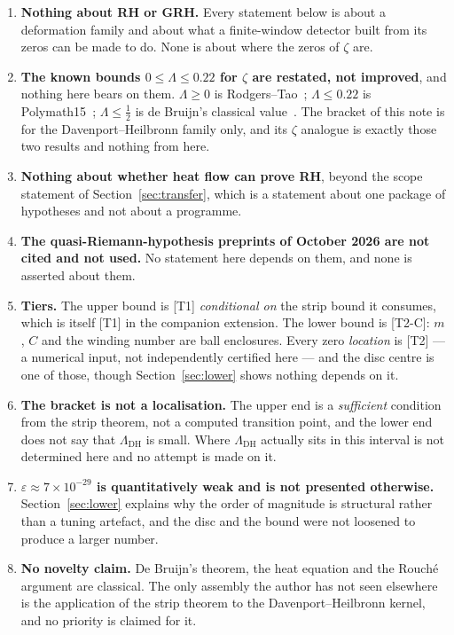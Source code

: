 \documentclass[11pt,a4paper]{article}
\theoremstyle{remark}
\newcommand{\tier}[1]{{\small\textsf{[#1]}}}
\newcommand{\LamDH}{\Lambda_{\mathrm{DH}}}
\begin{document}
\begin{enumerate}\itemsep3pt
\item \textbf{Nothing about RH or GRH.} Every statement below is about a deformation family
and about what a finite-window detector built from its zeros can be made to do. None is
about where the zeros of $\zeta$ are.

\item \textbf{The known bounds $0\le\Lambda\le0.22$ for $\zeta$ are restated, not
improved}, and nothing here bears on them. $\Lambda\ge0$ is Rodgers--Tao~\cite{RT};
$\Lambda\le0.22$ is Polymath15~\cite{P15}; $\Lambda\le\tfrac12$ is de Bruijn's classical
value~\cite{DB50}. The bracket of this note is for the Davenport--Heilbronn family only, and
its $\zeta$ analogue is exactly those two results and nothing from here.

\item \textbf{Nothing about whether heat flow can prove RH}, beyond the scope statement of
Section~\ref{sec:transfer}, which is a statement about one package of hypotheses and not
about a programme.

\item \textbf{The quasi-Riemann-hypothesis preprints of October 2026 are not cited and not
used.} No statement here depends on them, and none is asserted about them.

\item \textbf{Tiers.} The upper bound is \tier{T1} \emph{conditional on} the strip bound it
consumes, which is itself \tier{T1} in the companion extension. The lower bound is
\tier{T2-C}: $m$, $C$ and the winding number are ball enclosures. Every zero
\emph{location} is \tier{T2} --- a numerical input, not independently certified here --- and
the disc centre is one of those, though Section~\ref{sec:lower} shows nothing depends on it.

\item \textbf{The bracket is not a localisation.} The upper end is a \emph{sufficient}
condition from the strip theorem, not a computed transition point, and the lower end does
not say that $\LamDH$ is small. Where $\LamDH$ actually sits in this interval is not
determined here and no attempt is made on it.

\item \textbf{$\varepsilon\approx 7\times10^{-29}$ is quantitatively weak and is not
presented otherwise.} Section~\ref{sec:lower} explains why the order of magnitude is
structural rather than a tuning artefact, and the disc and the bound were not loosened to
produce a larger number.

\item \textbf{No novelty claim.} De Bruijn's theorem, the heat equation and the Rouch\'e
argument are classical. The only assembly the author has not seen elsewhere is the
application of the strip theorem to the Davenport--Heilbronn kernel, and no priority is
claimed for it.
\end{enumerate}
\end{document}
